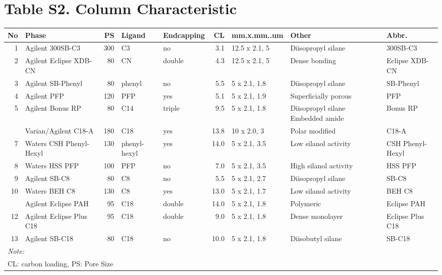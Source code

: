 \documentclass[
]{article}
\begin{document}
\newpage{}

\hypertarget{table-s2.-column-characteristic}{%
\section{Table S2. Column
Characteristic}\label{table-s2.-column-characteristic}}

\begin{table}[H]
\centering\begingroup\fontsize{7}{9}\selectfont

\begin{tabular}[t]{r>{\raggedright\arraybackslash}p{2.0cm}rllrl>{\raggedright\arraybackslash}p{2.0cm}>{\raggedright\arraybackslash}p{2.0cm}}
\toprule
No & Phase & PS & Ligand & Endcapping & CL & mm.x.mm..um & Other & Abbr.\\
\midrule
1 & Agilent 300SB-C3 & 300 & C3 & no & 3.1 & 12.5 x 2.1, 5 & Diisopropyl silane & 300SB-C3\\
2 & Agilent Eclipse XDB-CN & 80 & CN & double & 4.3 & 12.5 x 2.1, 5 & Dense bonding & Eclipse XDB-CN\\
3 & Agilent SB-Phenyl & 80 & phenyl & no & 5.5 & 5 x 2.1, 1.8 & Diisopropyl silane & SB-Phenyl\\
4 & Agilent PFP & 120 & PFP & yes & 5.1 & 5 x 2.1, 1.9 & Superficially porous & PFP\\
5 & Agilent Bonus RP & 80 & C14 & triple & 9.5 & 5 x 2.1, 1.8 & Diisopropyl silane Embedded amide & Bonus RP\\
\addlinespace
6 & Varian/Agilent C18-A & 180 & C18 & yes & 13.8 & 10 x 2.0, 3 & Polar modified & C18-A\\
7 & Waters CSH Phenyl-Hexyl & 130 & phenyl-hexyl & yes & 14.0 & 5 x 2.1, 3.5 & Low silanol activity & CSH Phenyl-Hexyl\\
8 & Waters HSS PFP & 100 & PFP & no & 7.0 & 5 x 2.1, 3.5 & High silanol activity & HSS PFP\\
9 & Agilent SB-C8 & 80 & C8 & no & 5.5 & 5 x 2.1, 2.7 & Diisopropyl silane & SB-C8\\
10 & Waters BEH C8 & 130 & C8 & yes & 13.0 & 5 x 2.1, 1.7 & Low silanol activity & BEH C8\\
\addlinespace
11 & Agilent Eclipse PAH & 95 & C18 & double & 14.0 & 5 x 2.1, 1.8 & Polymeric & Eclipse PAH\\
12 & Agilent Eclipse Plus C18 & 95 & C18 & double & 9.0 & 5 x 2.1, 1.8 & Dense monolayer & Eclipse Plus C18\\
13 & Agilent SB-C18 & 80 & C18 & no & 10.0 & 5 x 2.1, 1.8 & Diisobutyl silane & SB-C18\\
\bottomrule
\multicolumn{9}{l}{\rule{0pt}{1em}\textit{Note: }}\\
\multicolumn{9}{l}{\rule{0pt}{1em}CL: carbon loading, PS: Pore Size}\\
\end{tabular}
\endgroup{}
\end{table}
\end{document}
